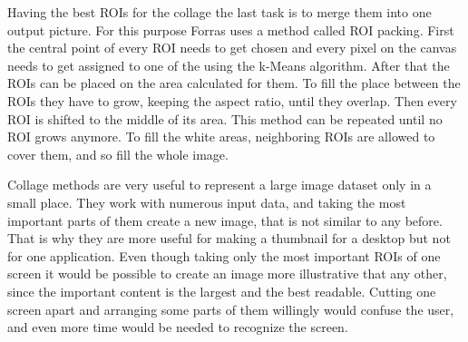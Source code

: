\documentclass[draft,final]{vutinfth} %
\begin{document}
Having the best ROIs for the collage the last task is to merge them into one output picture.
For this purpose Forras uses a method called ROI packing.
First the central point of every ROI needs to get chosen and every pixel on the canvas needs to get assigned to one of the using the k-Means algorithm.
After that the ROIs can be placed on the area calculated for them.
To fill the place between the ROIs they have to grow, keeping the aspect ratio, until they overlap. 
Then every ROI is shifted to the middle of its area.
This method can be repeated until no ROI grows anymore.
To fill the white areas, neighboring ROIs are allowed to cover them, and so fill the whole image.\par
Collage methods are very useful to represent a large image dataset only in a small place.
They work with numerous input data, and taking the most important parts of them create a new image, that is not similar to any before.
That is why they are more useful for making a thumbnail for a desktop but not for one application.
Even though taking only the most important ROIs of one screen it would be possible to create an image more illustrative that any other, since the important content is the largest and the best readable.
Cutting one screen apart and arranging some parts of them willingly would confuse the user, and even more time would be needed to recognize the screen.
\end{document}
